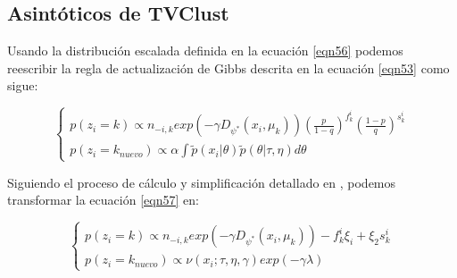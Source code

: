 \subsection{Asintóticos de TVClust}

Usando la distribución escalada definida en la ecuación \ref{eqn56} podemos reescribir la regla de actualización de Gibbs descrita en la ecuación \ref{eqn53} como sigue:

\begin{equation}
\begin{cases}
p(z_i = k) \varpropto n_{-i,k}exp(-\gamma D_{\psi^*}(x_i,\mu_k))\left(\frac{p}{1-q}\right)^{f_{k}^i} \left(\frac{1-p}{q}\right)^{s_{k}^i} \\
p(z_i = k_{nuevo}) \varpropto \alpha \int \widetilde{p}(x_i|\theta)\widetilde{p}(\theta|\tau, \eta)d\theta
\end{cases}
\label{eqn57}
\end{equation}

Siguiendo el proceso de cálculo y simplificación detallado en \cite{RDPM:2015}, podemos transformar la ecuación \ref{eqn57} en:

\begin{equation}
\begin{cases}
p(z_i = k) \varpropto n_{-i,k}exp(-\gamma D_{\psi^*}(x_i,\mu_k)) - f_{k}^i \xi_i + \xi_2 s_{k}^i \\
p(z_i = k_{nuevo}) \varpropto \nu(x_i; \tau, \eta, \gamma) exp(-\gamma \lambda)
\end{cases}
\label{eqn58}
\end{equation}








